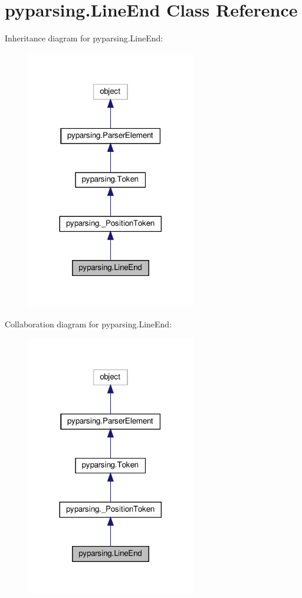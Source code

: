 \hypertarget{classpyparsing_1_1LineEnd}{}\section{pyparsing.\+Line\+End Class Reference}
\label{classpyparsing_1_1LineEnd}


Inheritance diagram for pyparsing.\+Line\+End\+:
\nopagebreak
\begin{figure}[H]
\begin{center}
\leavevmode
\includegraphics[width=209pt]{classpyparsing_1_1LineEnd__inherit__graph}
\end{center}
\end{figure}


Collaboration diagram for pyparsing.\+Line\+End\+:
\nopagebreak
\begin{figure}[H]
\begin{center}
\leavevmode
\includegraphics[width=209pt]{classpyparsing_1_1LineEnd__coll__graph}
\end{center}
\end{figure}
